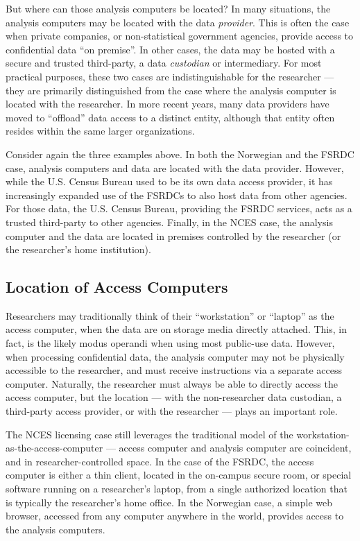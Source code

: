 But where can those analysis computers be located? In many situations, the analysis computers may be located with the data \textit{provider}. This is often the case when private companies, or non-statistical government agencies, provide access to confidential data ``on premise''. In other cases, the data may be hosted with a secure and trusted third-party, a data \textit{custodian} or intermediary. For most practical purposes, these two cases are indistinguishable for the researcher --- they are primarily distinguished from the case where the analysis computer is located with the researcher. In more recent years, many data providers have moved to ``offload'' data access to a distinct entity, although that entity often resides within the same larger organizations. 

Consider again the three examples above. In both the Norwegian and the FSRDC case, analysis computers and data are located with the data provider. However, while the U.S. Census Bureau used to be its own data access provider, it has increasingly expanded use of the \acp{FSRDC} to also host data from other agencies. For those data, the U.S. Census Bureau, providing the FSRDC services, acts as a trusted third-party to other agencies. Finally, in the NCES case, the analysis computer and the data are located in premises controlled by the researcher (or the researcher's home institution).

\subsection{Location of Access Computers}

Researchers may traditionally think of their ``workstation'' or ``laptop'' as the access computer, when the data are on storage media directly attached. This, in fact, is the likely modus operandi when using most public-use data. However, when processing confidential data,  the analysis computer may not be physically accessible to the researcher, and must receive instructions via a separate access computer. Naturally, the researcher must always be able to directly access the access computer, but the location ---  with the non-researcher data custodian, a third-party access provider, or with the researcher --- plays an important role. 

The NCES licensing case still leverages the traditional model of the workstation-as-the-access-computer --- access computer and analysis computer are coincident, and in researcher-controlled space. In the case of the FSRDC, the access computer is either a thin client, located in the on-campus secure room, or special software running on a researcher's laptop, from a single authorized location that is typically the researcher's home office. In the Norwegian case, a simple web browser, accessed from any computer anywhere in the world, provides access to the analysis computers. 

